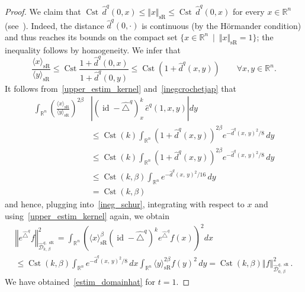 \documentclass[10pt]{amsart}
\theoremstyle{definition}\newtheorem{defi}[theo]{Definition}\newtheorem{rema}[theo]{Remark}\newtheorem{exam}[theo]{Example}\newtheorem{exem}[theo]{Example}\newtheorem{nota}[theo]{Notation}
\newcommand*\R{\mathbb{R}}
\newcommand{\calD}{\mathcal{D}}
\DeclareMathOperator{\Cst}{Cst}
\DeclareMathOperator{\id}{id}
\DeclareMathOperator{\sR}{sR}
\renewcommand{\leq}{\leqslant}
\let\oldforall\forall
\renewcommand*{\forall}{\mathrel{\oldforall}}
\begin{document}
\begin{proof}
We claim that $\Cst\, \widehat{d}^q(0,x)\leq \Vert x\Vert_{\sR} \leq \Cst\, \widehat{d}^q(0,x)$ for every $x\in\R^n$ (see~\cite[Lemma~2.1 p.~28]{Jean_2014}). Indeed, the distance $\widehat{d}^q(0,\cdot)$ is continuous (by the H\"ormander condition) and thus reaches its bounds on the compact set $\{x\in\R^n\ \mid\ \Vert x\Vert_{\sR}=1\}$; the inequality follows by homogeneity. We infer that
\begin{equation}\label{inegcrochetjap}
\frac{\langle x\rangle_{\sR}}{\langle y\rangle_{\sR}} \leq \Cst \frac{1+\widehat{d}^q(0,x)}{1+\widehat{d}^q(0,y)} \leq \Cst \left(1+\widehat{d}^q(x,y)\right) \qquad\forall x,y\in\R^n.
\end{equation}
It follows from~\eqref{upper_estim_kernel} and~\eqref{inegcrochetjap} that
\begin{align*}
\int_{\R^n} \left(\frac{\langle x\rangle_{\sR}}{\langle y\rangle_{\sR}} \right)^{2\beta} &\left\vert \left(\id - \widehat{\triangle}^q\right)_x^k\, \widehat{e}^q(1,x,y) \right\vert dy
\\
&\leq \Cst(k) \int_{\R^n} \left(1+\widehat{d}^q(x,y)\right)^{2\beta} e^{-\widehat{d}^q(x,\,y)^2/8} \, dy \\
&\leq \Cst(k) \int_{\R^n} \left(1+\widehat{d}^q(x,y)\right)^{2\beta} e^{-\widehat{d}^q(x,\,y)^2/8} \, dy\\
&\leq \Cst(k,\beta) \int_{\R^n} e^{-\widehat{d}^q(x,\,y)^2/16} \, dy\\
&=\Cst(k,\beta)
\end{align*}
and hence, plugging into~\eqref{ineg_schur}, integrating with respect to $x$ and using~\eqref{upper_estim_kernel} again, we obtain
\begin{multline}\label{estim_for_t1}
\left\Vert e^{\widehat{\triangle}^q} f \right\Vert_{\widehat{\calD}^{q,\,\sR}_{k,\,\beta}}^2 = \int_{\R^n} \left(\langle x\rangle_{\sR}^\beta \left(\id - \widehat{\triangle}^q\right)^k e^{\widehat{\triangle}^q} f(x) \right)^2 dx \\
\leq \Cst(k,\beta) \int_{\R^n} e^{-\widehat{d}^q(x,\,y)^2/8} \, dx \int_{\R^n} \langle y\rangle_{\sR}^{2\beta} f(y)^2\, dy = \Cst(k,\beta) \left\Vert f \right\Vert_{\widehat{\calD}^{q,\,\sR}_{0,\,\beta}}^2.
\end{multline}
We have obtained~\eqref{estim_domainhat} for $t=1$.


\end{proof}
\end{document}
